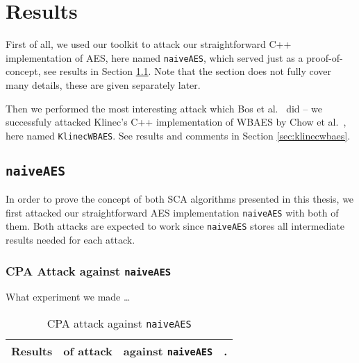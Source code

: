 \section{Results}
\label{sec:results}

First of all, we used our toolkit to attack our straightforward C++ implementation of AES, here named {\tt naiveAES}, which served just as a proof-of-concept, see results in Section \ref{sec:naiveaes}. Note that the section does not fully cover many details, these are given separately later.

Then we performed the most interesting attack which Bos et al.\ \cite{bos2015differential} did -- we successfuly attacked Klinec's C++ implementation \cite{klinec2013implementation} of WBAES by Chow et al.\ \cite{chow2002aes}, here named {\tt KlinecWBAES}. See results and comments in Section \ref{sec:klinecwbaes}.



\subsection{\tt naiveAES}
\label{sec:naiveaes}

In order to prove the concept of both SCA algorithms presented in this thesis, we first attacked our straightforward AES implementation {\tt naiveAES} with both of them. Both attacks are expected to work since {\tt naiveAES} stores all intermediate results needed for each attack.

\subsubsection{CPA Attack against {\tt naiveAES}}
	
	What experiment we made \ldots
	
	\begin{table}[H]
		\begin{center}
		\begin{tabular}{| c | c | c | c |}
			\hline
			Results & of attack & against {\tt naiveAES} & . \\
			\hline
		\end{tabular}
		\end{center}
	\caption{CPA attack against {\tt naiveAES}}
	\label{tab:naiveaescpa}
	\end{table}
	

